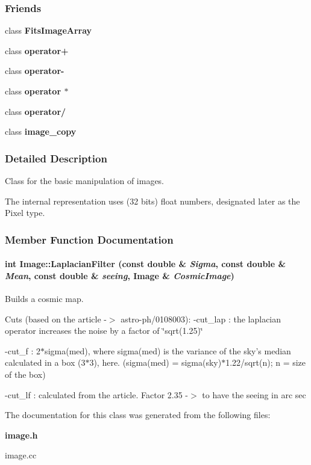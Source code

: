 \subsubsection*{Friends}
\begin{CompactItemize}
\item 
class {\bf Fits\-Image\-Array}
\item 
class {\bf operator+}
\item 
class {\bf operator-}
\item 
class {\bf operator $\ast$}
\item 
class {\bf operator/}
\item 
class {\bf image\_\-copy}
\end{CompactItemize}


\subsubsection{Detailed Description}
Class for the basic manipulation of images.

The internal representation uses (32 bits) float numbers, designated later as the Pixel type. 



\subsubsection{Member Function Documentation}
\paragraph{\setlength{\rightskip}{0pt plus 5cm}int Image::Laplacian\-Filter (const double \& {\em Sigma}, const double \& {\em Mean}, const double \& {\em seeing}, Image \& {\em Cosmic\-Image})}\hfill\label{class_image_a66}


Builds a cosmic map.

Cuts (based on the article -$>$ astro-ph/0108003):  -cut\_\-lap : the laplacian operator increases the noise by a factor of  \char`\"{}sqrt(1.25)\char`\"{}

-cut\_\-f : 2$\ast$sigma(med), where sigma(med) is the variance of the sky's median calculated in a box (3$\ast$3), here.  (sigma(med) = sigma(sky)$\ast$1.22/sqrt(n); n = size of the box)

-cut\_\-lf : calculated from the article. Factor 2.35 -$>$ to have the seeing in arc sec 

The documentation for this class was generated from the following files:\begin{CompactItemize}
\item 
{\bf image.h}\item 
image.cc\end{CompactItemize}

